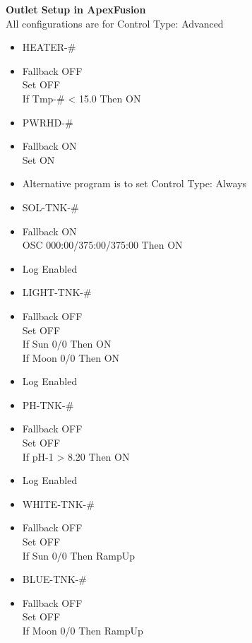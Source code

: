 \documentclass[]{book}
\providecommand{\tightlist}{%
  \setlength{\itemsep}{0pt}\setlength{\parskip}{0pt}}
\begin{document}
 \textbf{Outlet Setup in ApexFusion}\\
All configurations are for Control Type: Advanced

\begin{itemize}
\tightlist
\item
  HEATER-\#
\item
  Fallback OFF\\
  Set OFF\\
  If Tmp-\# \textless{} 15.0 Then ON\\
\item
  PWRHD-\#
\item
  Fallback ON\\
  Set ON\\
\item
  Alternative program is to set Control Type: Always\\
\item
  SOL-TNK-\#
\item
  Fallback ON\\
  OSC 000:00/375:00/375:00 Then ON\\
\item
  Log Enabled\\
\item
  LIGHT-TNK-\#
\item
  Fallback OFF\\
  Set OFF\\
  If Sun 0/0 Then ON\\
  If Moon 0/0 Then ON\\
\item
  Log Enabled\\
\item
  PH-TNK-\#
\item
  Fallback OFF\\
  Set OFF\\
  If pH-1 \textgreater{} 8.20 Then ON\\
\item
  Log Enabled\\
\item
  WHITE-TNK-\#
\item
  Fallback OFF\\
  Set OFF\\
  If Sun 0/0 Then RampUp\\
\item
  BLUE-TNK-\#
\item
  Fallback OFF\\
  Set OFF\\
  If Moon 0/0 Then RampUp\\

\end{itemize}
\end{document}
